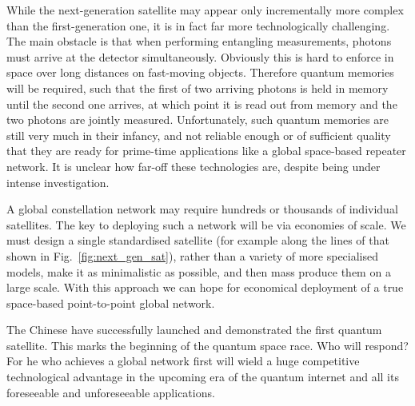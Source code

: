 While the next-generation satellite may appear only incrementally more complex than the first-generation one, it is in fact far more technologically challenging. The main obstacle is that when performing entangling measurements, photons must arrive at the detector simultaneously. Obviously this is hard to enforce in space over long distances on fast-moving objects. Therefore quantum memories will be required, such that the first of two arriving photons is held in memory until the second one arrives, at which point it is read out from memory and the two photons are jointly measured. Unfortunately, such quantum memories are still very much in their infancy, and not reliable enough or of sufficient quality that they are ready for prime-time applications like a global space-based repeater network. It is unclear how far-off these technologies are, despite being under intense investigation.

A global constellation network may require hundreds or thousands of individual satellites. The key to deploying such a network will be via economies of scale. We must design a single standardised satellite (for example along the lines of that shown in Fig.~\ref{fig:next_gen_sat}), rather than a variety of more specialised models, make it as minimalistic as possible, and then mass produce them on a large scale. With this approach we can hope for economical deployment of a true space-based point-to-point global network.

The Chinese have successfully launched and demonstrated the first quantum satellite. This marks the beginning of the quantum space race. Who will respond? For he who achieves a global network first will wield a huge competitive technological advantage in the upcoming era of the quantum internet and all its foreseeable and unforeseeable applications.